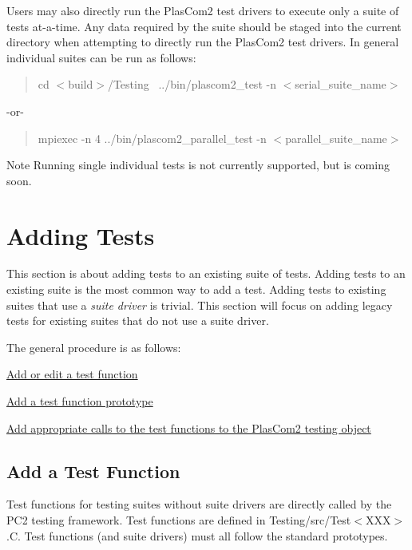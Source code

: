 Users may also directly run the Plas\+Com2 test drivers to execute only a suite of tests at-\/a-\/time. Any data required by the suite should be staged into the current directory when attempting to directly run the Plas\+Com2 test drivers. In general individual suites can be run as follows\+:

\begin{quote}
cd $<$build$>$/\+Testing~\newline
../bin/plascom2\+\_\+test -\/n $<$serial\+\_\+suite\+\_\+name$>$ \end{quote}
-\/or-\/ \begin{quote}
mpiexec -\/n 4 ../bin/plascom2\+\_\+parallel\+\_\+test -\/n $<$parallel\+\_\+suite\+\_\+name$>$ \end{quote}


\begin{DoxyNote}{Note}
Running single individual tests is not currently supported, but is coming soon.
\end{DoxyNote}
\hypertarget{testing_reference_addtest}{}\section{Adding Tests}\label{testing_reference_addtest}
This section is about adding tests to an existing suite of tests. Adding tests to an existing suite is the most common way to add a test. Adding tests to existing suites that use a {\itshape suite driver} is trivial. This section will focus on adding legacy tests for existing suites that do not use a suite driver.

The general procedure is as follows\+:


\begin{DoxyItemize}
\item \hyperlink{testing_reference_addfunc}{Add or edit a test function}
\item \hyperlink{testing_reference_addproto}{Add a test function prototype}
\item \hyperlink{testing_reference_addcall}{Add appropriate calls to the test functions to the Plas\+Com2 testing object}
\end{DoxyItemize}\hypertarget{testing_reference_addfunc}{}\subsection{Add a Test Function}\label{testing_reference_addfunc}
Test functions for testing suites without suite drivers are directly called by the P\+C2 testing framework. Test functions are defined in Testing/src/\+Test$<$\+X\+X\+X$>$.C. Test functions (and suite drivers) must all follow the standard prototypes.

